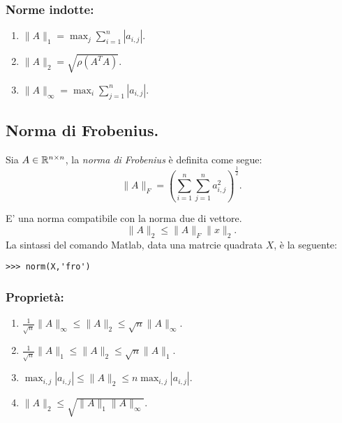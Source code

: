 \subsubsection{Norme indotte:}
\begin{enumerate}
\item $\|A\|_1 = \max_j \sum_{i=1}^n|a_{i,j}|$.
\item $\|A\|_2 = \sqrt{\rho(A^TA)}$. 
\item $\|A\|_\infty = \max_i \sum_{j=1}^n|a_{i,j}|$.
\end{enumerate}

\subsection{Norma di Frobenius.}
\begin{defi}
Sia $A \in \mathbb{R}^{n \times n}$, la \emph{norma di Frobenius} è definita come 
segue:
\[
\|A\|_F = \left( \sum_{i=1}^n\sum_{j=1}^na_{i,j}^2\right)^{\frac{1}{2}}.
\]
\end{defi}
E' una norma compatibile con la norma due di vettore.
\[
\|A\|_2 \leq \|A\|_F\|x\|_2.
\]
La sintassi del comando Matlab, data una matrcie quadrata $X$, è la seguente:
\begin{codice}
\begin{verbatim}
>>> norm(X,'fro')
\end{verbatim}
\end{codice}

\subsubsection{Proprietà:}

\begin{enumerate}
\item $\frac{1}{\sqrt{n}}\|A\|_\infty \leq \|A\|_2 \leq \sqrt{n}\|A\|_\infty$.
\item $\frac{1}{\sqrt{n}}\|A\|_1 \leq \|A\|_2 \leq \sqrt{n}\|A\|_1$.
\item $\max_{i,j} |a_{i,j}| \leq \|A\|_2 \leq n \max_{i,j}|a_{i,j}|$.
\item $\|A\|_2 \leq \sqrt{\|A\|_1 \|A\|_\infty}$.
\end{enumerate}
